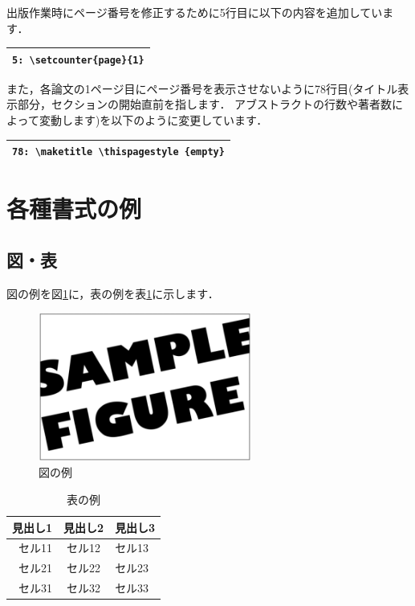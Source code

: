 \documentclass[T,J]{fose} %
\begin{document}
出版作業時にページ番号を修正するために5行目に以下の内容を追加しています．

\begin{tabularx}{23zw}{|X|}
	\hline
	\verb|5: \setcounter{page}{1}|
	\\
	\hline
\end{tabularx}

また，各論文の1ページ目にページ番号を表示させないように78行目(タイトル表示部分，セクションの開始直前を指します．
アブストラクトの行数や著者数によって変動します)を以下のように変更しています．\\

\begin{tabularx}{23zw}{|X|}
	\hline
	\verb|78: \maketitle \thispagestyle {empty}|
	\\
	\hline
\end{tabularx}


\section{各種書式の例}
\subsection{図・表}
図の例を図\ref{fig:figExample}に，表の例を表\ref{table:tableExample}に示します．

\begin{figure}[tb]
	\centering
	\includegraphics[width=7.0cm]{image/sampleFig.png}
	\caption{図の例}
	\label{fig:figExample}
\end{figure}

\begin{table}[tb]
	\centering
	\caption{表の例}
	\label{table:tableExample}
	\begin{tabular}{rcl}
		\hline %
		見出し1 & 見出し2& 見出し3 \\ \hline
		\hline %
		セル11 & セル12 & セル13 \\ \hline
		セル21 & セル22 & セル23 \\ \hline
		セル31 & セル32 & セル33 \\ \hline
		\hline
	\end{tabular}
\end{table}
\end{document}
